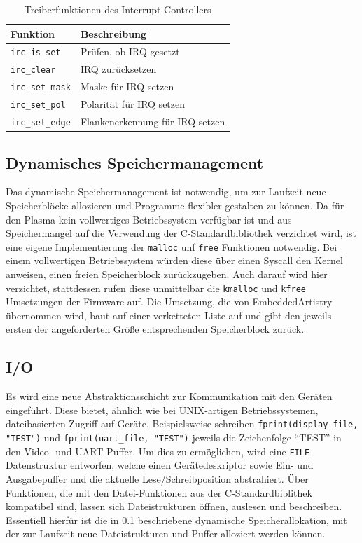 \begin{table}[!htbp]
	\bigskip
	\centering
	\begin{tabular}{ l | l }
		\textbf{Funktion} & \textbf{Beschreibung} \\
		\hline		
		\texttt{irc\_is\_set} & Prüfen, ob \gls{IRQ} gesetzt \\
		\texttt{irc\_clear} & \gls{IRQ} zurücksetzen \\
		\texttt{irc\_set\_mask} & Maske für \gls{IRQ} setzen \\
		\texttt{irc\_set\_pol} & Polarität für \gls{IRQ} setzen \\
		\texttt{irc\_set\_edge} & Flankenerkennung für \gls{IRQ} setzen \\
		\hline
	\end{tabular}
	
	\caption{Treiberfunktionen des Interrupt-Controllers}
	\label{tab:drv_irc_func}
\end{table}

\subsection{Dynamisches Speichermanagement}
\label{sec:memalloc}

Das dynamische Speichermanagement ist notwendig, um zur Laufzeit neue Speicherblöcke allozieren und Programme flexibler gestalten zu können. Da für den Plasma kein vollwertiges Betriebssystem verfügbar ist und aus Speichermangel auf die Verwendung der C-Standardbibliothek verzichtet wird, ist eine eigene Implementierung der \texttt{malloc} unf \texttt{free} Funktionen notwendig. Bei einem vollwertigen Betriebssystem würden diese über einen Syscall den Kernel anweisen, einen freien Speicherblock zurückzugeben. Auch darauf wird hier verzichtet, stattdessen rufen diese unmittelbar die \texttt{kmalloc} und \texttt{kfree} Umsetzungen der Firmware auf. Die Umsetzung, die von EmbeddedArtistry \cite{website:embedded_artistry_malloc} übernommen wird, baut auf einer verketteten Liste auf und gibt den jeweils ersten der angeforderten Größe entsprechenden Speicherblock zurück. 

\subsection{I/O}

Es wird eine neue Abstraktionsschicht zur Kommunikation mit den Geräten eingeführt. Diese bietet, ähnlich wie bei UNIX-artigen Betriebssystemen, dateibasierten Zugriff auf Geräte. Beispielsweise schreiben \texttt{fprint(display_file, "TEST")} und \texttt{fprint(uart_file, "TEST")} jeweils die Zeichenfolge \enquote{TEST} in den Video- und \gls{UART}-Puffer.  
Um dies zu ermöglichen, wird eine \texttt{FILE}-Datenstruktur entworfen, welche einen Gerätedeskriptor sowie Ein- und Ausgabepuffer und die aktuelle Lese/Schreibposition abstrahiert. Über Funktionen, die mit den Datei-Funktionen aus der C-Standardbiblithek kompatibel sind, lassen sich Dateistrukturen öffnen, auslesen und beschreiben.
Essentiell hierfür ist die in \cref{sec:memalloc} beschriebene dynamische Speicherallokation, mit der zur Laufzeit neue Dateistrukturen und Puffer alloziert werden können.

